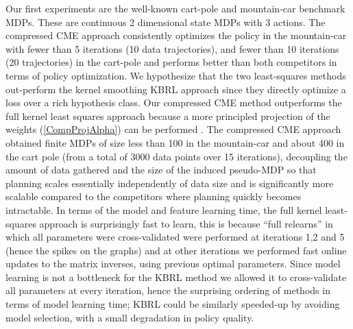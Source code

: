 \documentclass[letterpaper]{article}
\begin{document}
Our first experiments are the well-known cart-pole and mountain-car benchmark MDPs. These are continuous 2 dimensional state MDPs with 3 actions. The compressed CME approach consistently optimizes the policy in the mountain-car with fewer than 5 iterations (10 data trajectories), and fewer than 10 iterations (20 trajectories) in the cart-pole and performs better than both competitors in terms of policy optimization. We hypothesize that the two least-squares methods out-perform the kernel smoothing KBRL approach since they directly optimize a loss over a rich hypothesis class. Our compressed CME method outperforms the full kernel least squares approach because a more principled projection of the weights (\ref{CompProjAlpha}) can be performed . The compressed CME approach obtained finite MDPs of size less than 100 in the mountain-car and about 400 in the cart pole (from a total of 3000 data points over 15 iterations), decoupling the amount of data gathered and the size of the induced pseudo-MDP so that planning scales essentially independently of data size and is significantly more scalable compared to the competitors where planning quickly becomes intractable. In terms of the model and feature learning time, the full kernel least-squares approach is surprisingly fast to learn, this is because ``full relearns'' in which all parameters were cross-validated were performed at iterations 1,2 and 5 (hence the spikes on the graphs) and at other iterations we performed fast online updates to the matrix inverses, using previous optimal parameters. Since model learning is not a bottleneck for the KBRL method we allowed it to cross-validate all parameters at every iteration, hence the surprising ordering of methods in terms of model learning time; KBRL could be similarly speeded-up by avoiding model selection, with a small degradation in policy quality.
\end{document}
